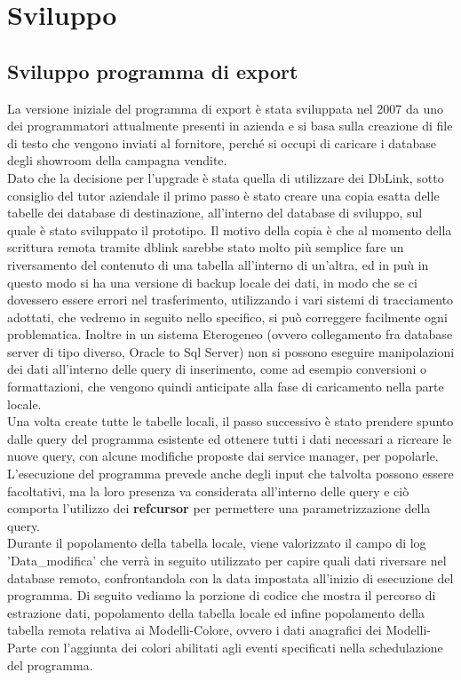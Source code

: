 \section{Sviluppo}
\subsection{Sviluppo programma di export}
La versione iniziale del programma di export è stata sviluppata nel 2007 da uno dei programmatori attualmente presenti in azienda e si basa sulla creazione di file di testo che vengono inviati al fornitore, perché si occupi di caricare i database degli showroom della campagna vendite.\\
Dato che la decisione per l'upgrade è stata quella di utilizzare dei DbLink, sotto consiglio del tutor aziendale il primo passo è stato creare una copia esatta delle tabelle dei database di destinazione, all'interno del database di sviluppo, sul quale è stato sviluppato il prototipo. Il motivo della copia è che al momento della scrittura remota tramite dblink sarebbe stato molto più semplice fare un riversamento del contenuto di una tabella all'interno di un'altra, ed in puù in questo modo si ha una versione di backup locale dei dati, in modo che se ci dovessero essere errori nel trasferimento, utilizzando i vari sistemi di tracciamento adottati, che vedremo in seguito nello specifico, si può correggere facilmente ogni problematica. Inoltre in un sistema Eterogeneo (ovvero collegamento fra database server di tipo diverso, Oracle to Sql Server) non si possono eseguire manipolazioni dei dati all'interno delle query di inserimento, come ad esempio conversioni o formattazioni, che vengono quindi anticipate alla fase di caricamento nella parte locale.\\
Una volta create tutte le tabelle locali, il passo successivo è stato prendere spunto dalle query del programma esistente ed ottenere tutti i dati necessari a ricreare le nuove query, con alcune modifiche proposte dai service manager, per popolarle. L'esecuzione del programma prevede anche degli input che talvolta possono essere facoltativi, ma la loro presenza va considerata all'interno delle query e ciò comporta l'utilizzo dei \textbf{refcursor} per permettere una parametrizzazione della query.\\
Durante il popolamento della tabella locale, viene valorizzato il campo di log 'Data\_modifica' che verrà in seguito utilizzato per capire quali dati riversare nel database remoto, confrontandola con la data impostata all'inizio di esecuzione del programma.
Di seguito vediamo la porzione di codice che mostra il percorso di estrazione dati, popolamento della tabella locale ed infine popolamento della tabella remota relativa ai Modelli-Colore, ovvero i dati anagrafici dei Modelli-Parte con l'aggiunta dei colori abilitati agli eventi specificati nella schedulazione del programma.\\

